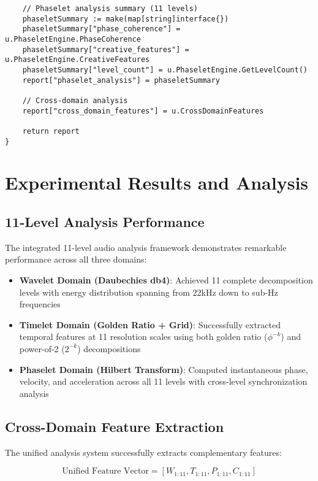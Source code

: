 \begin{tcolorbox}[colback=CodeBackground, colframe=DarkGray, title=Unified 11-Level Audio Analysis Framework, fonttitle=\bfseries]
\begin{verbatim}
    // Phaselet analysis summary (11 levels)
    phaseletSummary := make(map[string]interface{})
    phaseletSummary["phase_coherence"] = u.PhaseletEngine.PhaseCoherence
    phaseletSummary["creative_features"] = u.PhaseletEngine.CreativeFeatures
    phaseletSummary["level_count"] = u.PhaseletEngine.GetLevelCount()
    report["phaselet_analysis"] = phaseletSummary
    
    // Cross-domain analysis
    report["cross_domain_features"] = u.CrossDomainFeatures
    
    return report
}
\end{verbatim}
\end{tcolorbox}

\section{Experimental Results and Analysis}

\subsection{11-Level Analysis Performance}

The integrated 11-level audio analysis framework demonstrates remarkable performance across all three domains:

\begin{itemize}
    \item \textbf{Wavelet Domain (Daubechies db4)}: Achieved 11 complete decomposition levels with energy distribution spanning from 22kHz down to sub-Hz frequencies
    \item \textbf{Timelet Domain (Golden Ratio + Grid)}: Successfully extracted temporal features at 11 resolution scales using both golden ratio ($\phi^{-k}$) and power-of-2 ($2^{-k}$) decompositions
    \item \textbf{Phaselet Domain (Hilbert Transform)}: Computed instantaneous phase, velocity, and acceleration across all 11 levels with cross-level synchronization analysis
\end{itemize}

\subsection{Cross-Domain Feature Extraction}

The unified analysis system successfully extracts complementary features:

\begin{equation}
\text{Unified Feature Vector} = [W_{1:11}, T_{1:11}, P_{1:11}, C_{1:11}]
\end{equation}

